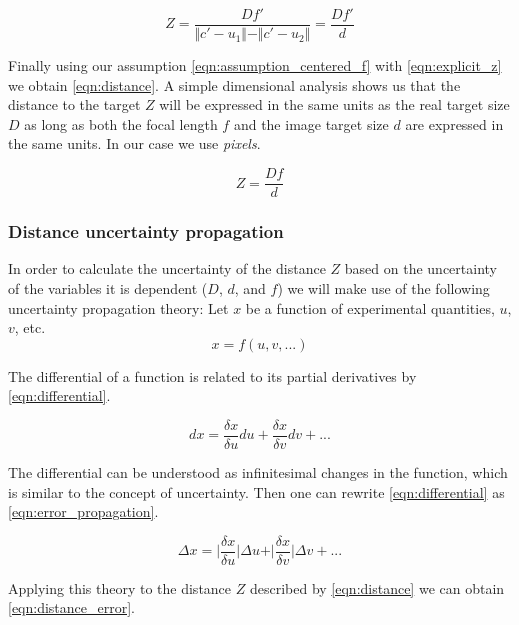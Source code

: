 \documentclass[
a4paper,
12pt,
]{article}
\begin{document}
\begin{equation}
\label{eqn:explicit_z}
Z = \frac{D f'}{\Vert c'-u_{1} \Vert-\Vert c'-u_{2} \Vert}
= \frac{D f'}{d}
\end{equation}

Finally using our assumption  \autoref{eqn:assumption_centered_f} with \autoref{eqn:explicit_z} we obtain \autoref{eqn:distance}. A simple dimensional analysis shows us that the distance to the target $Z$ will be expressed in the same units as the real target size $D$ as long as both the focal length $f$ and the image target size $d$ are expressed in the same units. In our case we use \emph{pixels}.

\begin{equation}
\label{eqn:distance}
Z = \frac{D f}{d}
\end{equation}

\subsubsection{Distance uncertainty propagation}
\label{subsubsec:distance_error_propagation}

In order to calculate the uncertainty of the distance $Z$ based on the uncertainty of the variables it is dependent ($D$, $d$, and $f$) we will make use of the following uncertainty propagation theory: Let $x$ be a function of experimental quantities, $u$, $v$, etc.
\begin{equation}
x=f(u,v, ...)
\end{equation}

The differential of a function is related to its partial derivatives by \autoref{eqn:differential}.

\begin{equation}
\label{eqn:differential}
dx = \frac{\delta x}{\delta u}du + \frac{\delta x}{\delta v}dv +...
\end{equation}

The differential can be understood as infinitesimal changes in the function, which is similar to the concept of uncertainty. Then one can rewrite \autoref{eqn:differential} as \autoref{eqn:error_propagation}.

\begin{equation}
\label{eqn:error_propagation}
\Delta x = \vert \frac{\delta x}{\delta u}\vert \Delta u + \vert \frac{\delta x}{\delta v}\vert \Delta v +...
\end{equation}

Applying this theory to the distance $Z$ described by \autoref{eqn:distance} we can obtain \autoref{eqn:distance_error}.
\end{document}
